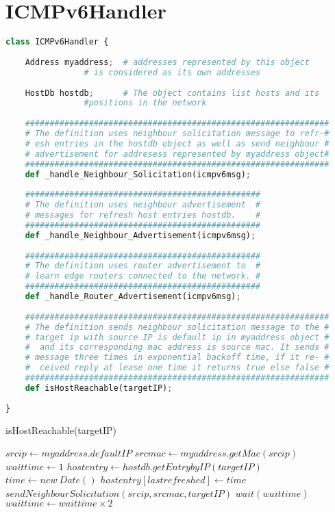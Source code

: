 \documentclass[10pt,a4paper,titlepage]{report}
\begin{document}
\section{ICMPv6Handler}
\begin{lstlisting}[language=Python]
class ICMPv6Handler {
	
	Address myaddress;	# addresses represented by this object 
				# is considered as its own addresses
	
	HostDb hostdb;		# The object contains list hosts and its 
				#positions in the network
	
	##############################################################
	# The definition uses neighbour solicitation message to refr-#
	# esh entries in the hostdb object as well as send neighbour #
	# advertisement for addresess represented by myaddress object#
	##############################################################
	def _handle_Neighbour_Solicitation(icmpv6msg);
	
	################################################
	# The definition uses neighbour advertisement  #
	# messages for refresh host entries hostdb.    #
	################################################
	def _handle_Neighbour_Advertisement(icmpv6msg);
	
	################################################
	# The definition uses router advertisement to  #
	# learn edge routers connected to the network. #
	################################################
	def _handle_Router_Advertisement(icmpv6msg);
	
	##############################################################
	# The definition sends neighbour solicitation message to the #
	# target ip with source IP is default ip in myaddress object #
	#  and its corresponding mac address is source mac. It sends #
	# message three times in exponential backoff time, if it re- #
	#  ceived reply at lease one time it returns true else false #
	##############################################################
	def isHostReachable(targetIP);
	
}
\end{lstlisting}

\begin{algorithm}
	\caption{isHostReachable(targetIP)}
	\begin{algorithmic}[1]
		\STATE $srcip \leftarrow myaddress.defaultIP$
		\STATE $srcmac \leftarrow myaddress.getMac(srcip)$
		\STATE $waittime \leftarrow 1$
		\STATE $hostentry \leftarrow hostdb.getEntrybyIP(targetIP)$
			\STATE $time \leftarrow new\ Date()$
			\STATE $hostentry[lastrefreshed] \leftarrow time$
			\STATE $sendNeighbourSolicitation(srcip, srcmac, targetIP)$
			\STATE $wait(waittime)$
				\RETURN \TRUE
			\ELSE
				\STATE $waittime \leftarrow waittime \times 2$
			\ENDIF
		\ENDFOR
		\RETURN \FALSE
	\end{algorithmic}
\end{algorithm}
	
\end{document}
